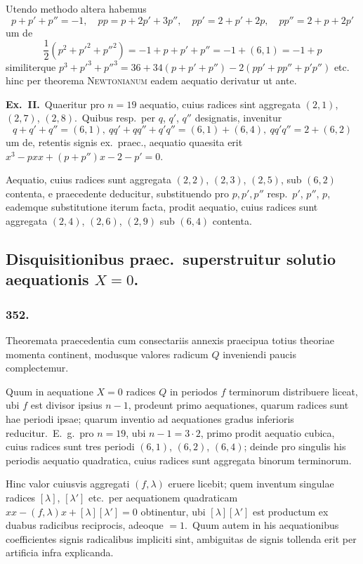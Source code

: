 \documentclass[12pt,a4paper]{article}
\theoremstyle{plain}
\theoremstyle{definition}
\theoremstyle{remark}
\begin{document}
Utendo methodo altera habemus
\[p+p'+p''=-1,\quad pp=p+2p'+3p'',\quad pp'=2+p'+2p,\quad pp''=2+p+2p'\]
um de
\[\frac{1}{2}(p^2+p'^2+p''^2) = -1+p+p'+p'' = -1+(6,1) = -1+p\]
similiterque $p^3+p'^3+p''^3 = 36+34(p+p'+p'')-2(pp'+pp''+p'p'')$ etc.
hinc per theorema \textsc{Newtonianum} eadem aequatio derivatur ut ante.

\textbf{Ex.\ II.}\ Quaeritur pro $n=19$ aequatio, cuius radices sint aggregata
$(2,1)$, $(2,7)$, $(2,8)$.\ Quibus resp.\ per $q$, $q'$, $q''$ designatis,
invenitur
\[q+q'+q''=(6,1),\ qq'+qq''+q'q''=(6,1)+(6,4),\ qq'q''=2+(6,2)\]
um de, retentis signis ex.\ praec., aequatio quaesita erit
$x^3-pxx+(p+p'')x-2-p'=0$.

Aequatio, cuius radices sunt aggregata $(2,2)$, $(2,3)$, $(2,5)$, sub
$(6,2)$ contenta, e praecedente deducitur, substituendo pro $p,p',p''$
resp.\ $p'$, $p''$, $p$, eademque substitutione iterum facta, prodit
aequatio, cuius radices sunt aggregata $(2,4)$, $(2,6)$, $(2,9)$ sub
$(6,4)$ contenta.

\subsection*{Disquisitionibus praec.\ superstruitur solutio aequationis $X=0$.}

\subsubsection*{352.}

Theoremata praecedentia cum consectariis annexis praecipua totius
theoriae momenta continent, modusque valores radicum $Q$ inveniendi
paucis complectemur.

Quum in aequatione $X=0$ radices $Q$ in periodos $f$ terminorum
distribuere liceat, ubi $f$ est divisor ipsius $n-1$, prodeunt primo
aequationes, quarum radices sunt hae periodi ipsae; quarum inventio ad
aequationes gradus inferioris reducitur.\ E.\ g.\ pro $n=19$, ubi
$n-1=3\cdot 2$, primo prodit aequatio cubica, cuius radices sunt tres
periodi $(6,1)$, $(6,2)$, $(6,4)$; deinde pro singulis his periodis aequatio
quadratica, cuius radices sunt aggregata binorum terminorum.

Hinc valor cuiusvis aggregati $(f,\lambda)$ eruere licebit; quem inventum
singulae radices $[\lambda]$, $[\lambda']$ etc.\ per aequationem quadraticam
$xx-(f,\lambda)x+[\lambda][\lambda']=0$ obtinentur, ubi $[\lambda][\lambda']$ est productum
ex duabus radicibus reciprocis, adeoque $=1$.\ Quum autem in his
aequationibus coefficientes signis radicalibus impliciti sint, ambiguitas
de signis tollenda erit per artificia infra explicanda.
\end{document}
